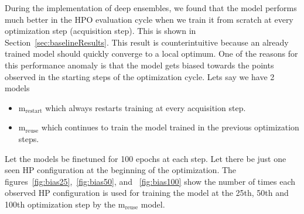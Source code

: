 \documentclass[12pt, twoside, ngerman]{report}
\begin{document}
During the implementation of deep ensembles, we found that the model performs much better in the HPO evaluation cycle when we train it from scratch at every optimization step (acquisition step). This is shown in Section~\ref{sec:baselineResults}.
This result is counterintuitive because an already trained model should quickly converge to a local optimum.
One of the reasons for this performance anomaly is that the model gets biased towards the points observed in the starting steps of the optimization cycle.
Lets say we have 2 models 
\begin{itemize}
\item $\textrm{m}_{\textrm{restart}}$ which always restarts training at every acquisition step.
\item $\textrm{m}_{\textrm{reuse}}$ which continues to train the model trained in the previous optimization steps.
\end{itemize}
Let the models be finetuned for 100 epochs at each step.
Let there be just one seen HP configuration at the beginning of the optimization.
The figures~\ref{fig:bias25},~\ref{fig:bias50},  and ~\ref{fig:bias100} show the number of times each observed HP configuration is used for training the model at the 25th, 50th and 100th optimization step by the $\textrm{m}_{\textrm{reuse}}$ model.
\end{document}
